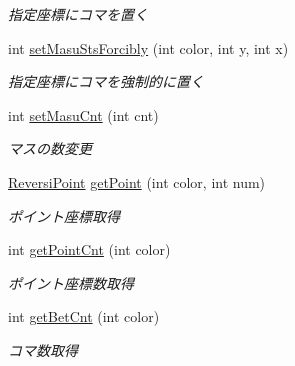 \begin{DoxyCompactItemize}
\begin{DoxyCompactList}\small\item\em 指定座標にコマを置く \end{DoxyCompactList}\item 
int \hyperlink{classjp_1_1gr_1_1java__conf_1_1yuta__yoshinaga_1_1reversi_1_1model_1_1_reversi_af2ba1c808c067c94106d04ccd5e25e3b}{set\+Masu\+Sts\+Forcibly} (int color, int y, int x)
\begin{DoxyCompactList}\small\item\em 指定座標にコマを強制的に置く \end{DoxyCompactList}\item 
int \hyperlink{classjp_1_1gr_1_1java__conf_1_1yuta__yoshinaga_1_1reversi_1_1model_1_1_reversi_a0e9bc15d570635cf024287fbf541b4b9}{set\+Masu\+Cnt} (int cnt)
\begin{DoxyCompactList}\small\item\em マスの数変更 \end{DoxyCompactList}\item 
\hyperlink{classjp_1_1gr_1_1java__conf_1_1yuta__yoshinaga_1_1reversi_1_1model_1_1_reversi_point}{Reversi\+Point} \hyperlink{classjp_1_1gr_1_1java__conf_1_1yuta__yoshinaga_1_1reversi_1_1model_1_1_reversi_ab180757b310c3a72cf159043ba0dc09e}{get\+Point} (int color, int num)
\begin{DoxyCompactList}\small\item\em ポイント座標取得 \end{DoxyCompactList}\item 
int \hyperlink{classjp_1_1gr_1_1java__conf_1_1yuta__yoshinaga_1_1reversi_1_1model_1_1_reversi_a8ab289d67a725a30e92411c90b755bd8}{get\+Point\+Cnt} (int color)
\begin{DoxyCompactList}\small\item\em ポイント座標数取得 \end{DoxyCompactList}\item 
int \hyperlink{classjp_1_1gr_1_1java__conf_1_1yuta__yoshinaga_1_1reversi_1_1model_1_1_reversi_a9f826e110ec3298a6bc5d6987a94519c}{get\+Bet\+Cnt} (int color)
\begin{DoxyCompactList}\small\item\em コマ数取得 \end{DoxyCompactList}\item 
\mbox{\label{classjp_1_1gr_1_1java__conf_1_1yuta__yoshinaga_1_1reversi_1_1model_1_1_reversi_a418bc05a3aaa3252455e75d10e1d1441}} 

\end{DoxyCompactItemize}
